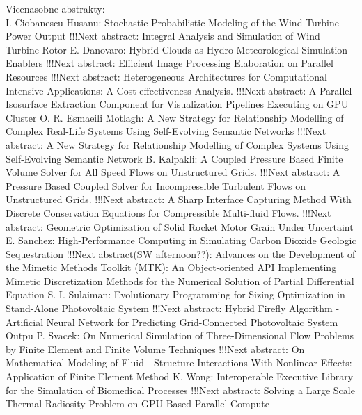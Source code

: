 \documentclass[10pt, A4]{article}%
\begin{document}
\newpage
Vicenasobne abstrakty:\\
{I. Ciobanescu Husanu}: {Stochastic-Probabilistic Modeling of the Wind Turbine Power Output      !!!Next abstract: Integral Analysis and Simulation of Wind Turbine Rotor}
{E. Danovaro}: {Hybrid Clouds as Hydro-Meteorological Simulation Enablers      !!!Next abstract: Efficient Image Processing Elaboration on Parallel Resources      !!!Next abstract: Heterogeneous Architectures for Computational Intensive Applications: A Cost-effectiveness Analysis.      !!!Next abstract: A Parallel Isosurface Extraction Component for Visualization Pipelines Executing on GPU Cluster}
{O. R. Esmaeili Motlagh}: {A New Strategy for Relationship Modelling of Complex Real-Life Systems Using Self-Evolving Semantic Networks      !!!Next abstract: A New Strategy for Relationship Modelling of Complex Systems Using Self-Evolving Semantic Network}
{B. Kalpakli}: {A Coupled Pressure Based Finite Volume Solver for All Speed Flows on Unstructured Grids.      !!!Next abstract: A Pressure Based Coupled Solver for Incompressible Turbulent Flows on Unstructured Grids.      !!!Next abstract: A Sharp Interface Capturing Method With Discrete Conservation Equations for Compressible Multi-fluid Flows.      !!!Next abstract: Geometric Optimization of Solid Rocket Motor Grain Under Uncertaint}
{E. Sanchez}: {High-Performance Computing in Simulating Carbon Dioxide Geologic Sequestration      !!!Next abstract(SW afternoon??): Advances on the Development of the Mimetic Methods Toolkit (MTK): An Object-oriented API Implementing Mimetic Discretization Methods for the Numerical Solution of Partial Differential Equation}
{S. I. Sulaiman}: {Evolutionary Programming for Sizing Optimization in Stand-Alone Photovoltaic System      !!!Next abstract: Hybrid Firefly Algorithm - Artificial Neural Network for Predicting Grid-Connected Photovoltaic System Outpu}
{P. Svacek}: {On Numerical Simulation of Three-Dimensional Flow Problems by Finite Element and Finite Volume Techniques      !!!Next abstract: On Mathematical Modeling of Fluid - Structure Interactions With Nonlinear Effects: Application of Finite Element Method}
{K. Wong}: {Interoperable Executive Library for the Simulation of Biomedical Processes      !!!Next abstract: Solving a Large Scale Thermal Radiosity Problem on GPU-Based Parallel Compute}
\end{document}
